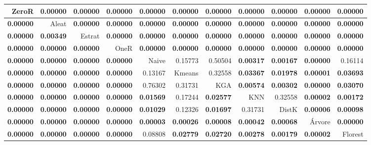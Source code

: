 \begin{table}
\centering
\label{Wine_teste_pareado_table}
\begin{tabular}{rrrrrrrrrrr}
\toprule
         ZeroR & \textbf{0.00000} & \textbf{0.00000} & \textbf{0.00000} & \textbf{0.00000} & \textbf{0.00000} & \textbf{0.00000} & \textbf{0.00000} & \textbf{0.00000} & \textbf{0.00000} & \textbf{0.00000} \\ \hline
\textbf{0.00000} &          Aleat & \textbf{0.00000} & \textbf{0.00000} & \textbf{0.00000} & \textbf{0.00000} & \textbf{0.00000} & \textbf{0.00000} & \textbf{0.00000} & \textbf{0.00000} & \textbf{0.00000} \\ \hline
\textbf{0.00000} & \textbf{0.00349} &          Estrat & \textbf{0.00000} & \textbf{0.00000} & \textbf{0.00000} & \textbf{0.00000} & \textbf{0.00000} & \textbf{0.00000} & \textbf{0.00000} & \textbf{0.00000} \\ \hline
\textbf{0.00000} & \textbf{0.00000} & \textbf{0.00000} &          OneR & \textbf{0.00000} & \textbf{0.00000} & \textbf{0.00000} & \textbf{0.00000} & \textbf{0.00000} & \textbf{0.00000} & \textbf{0.00000} \\ \hline
\textbf{0.00000} & \textbf{0.00000} & \textbf{0.00000} & \textbf{0.00000} &          Naive &          0.15773 &          0.50504 & \textbf{0.00317} & \textbf{0.00167} & \textbf{0.00000} &          0.16114 \\ \hline
\textbf{0.00000} & \textbf{0.00000} & \textbf{0.00000} & \textbf{0.00000} &          0.13167 &          Kmeans &          0.32558 & \textbf{0.03367} & \textbf{0.01978} & \textbf{0.00001} & \textbf{0.03693} \\ \hline
\textbf{0.00000} & \textbf{0.00000} & \textbf{0.00000} & \textbf{0.00000} &          0.76302 &          0.31731 &          KGA & \textbf{0.00574} & \textbf{0.00302} & \textbf{0.00000} & \textbf{0.03070} \\ \hline
\textbf{0.00000} & \textbf{0.00000} & \textbf{0.00000} & \textbf{0.00000} & \textbf{0.01569} &          0.17244 & \textbf{0.02577} &          KNN &          0.32558 & \textbf{0.00002} & \textbf{0.00172} \\ \hline
\textbf{0.00000} & \textbf{0.00000} & \textbf{0.00000} & \textbf{0.00000} & \textbf{0.01029} &          0.12326 & \textbf{0.01697} &          0.31731 &          DistK & \textbf{0.00006} & \textbf{0.00098} \\ \hline
\textbf{0.00000} & \textbf{0.00000} & \textbf{0.00000} & \textbf{0.00000} & \textbf{0.00003} & \textbf{0.00026} & \textbf{0.00008} & \textbf{0.00042} & \textbf{0.00068} &          Árvore & \textbf{0.00000} \\ \hline
\textbf{0.00000} & \textbf{0.00000} & \textbf{0.00000} & \textbf{0.00000} &          0.08808 & \textbf{0.02779} & \textbf{0.02720} & \textbf{0.00278} & \textbf{0.00179} & \textbf{0.00002} &          Florest \\ \hline
\bottomrule
\end{tabular}
\end{table}

